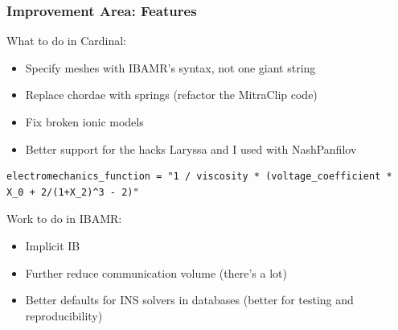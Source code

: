 \documentclass[8pt]{beamer}
\begin{document}
\begin{frame}[fragile]
  \frametitle{Improvement Area: Features}
  What to do in Cardinal:
  \begin{itemize}
    \item[$\blacksquare$] Specify meshes with IBAMR's syntax, not one giant string
    \item[$\blacksquare$] Replace chordae with springs (refactor the MitraClip code)
    \item[$\blacksquare$] Fix broken ionic models
    \item[$\blacksquare$] Better support for the hacks Laryssa and I used with NashPanfilov
  \end{itemize}
  \begin{lstlisting}
electromechanics_function = "1 / viscosity * (voltage_coefficient * X_0 + 2/(1+X_2)^3 - 2)"
  \end{lstlisting}
  \vfill

  Work to do in IBAMR:
  \begin{itemize}
    \item[$\blacksquare$] Implicit IB
    \item[$\blacksquare$] Further reduce communication volume (there's a lot)
    \item[$\blacksquare$] Better defaults for INS solvers in databases (better
      for testing and reproducibility)
  \end{itemize}
\end{frame}
\end{document}
